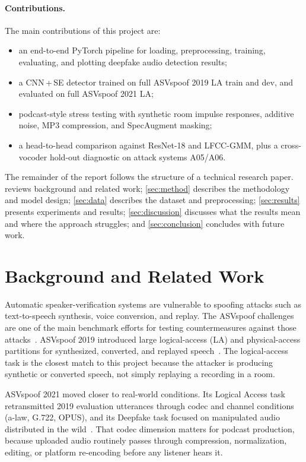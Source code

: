 \documentclass[11pt, letterpaper]{article}
\begin{document}
\paragraph{Contributions.}
The main contributions of this project are:
\begin{itemize}
    \item an end-to-end PyTorch pipeline for loading, preprocessing, training, evaluating, and plotting deepfake audio detection results;
    \item a CNN\,+\,SE detector trained on full ASVspoof 2019 LA train and dev, and evaluated on full ASVspoof 2021 LA;
    \item podcast-style stress testing with synthetic room impulse responses, additive noise, MP3 compression, and SpecAugment masking;
    \item a head-to-head comparison against ResNet-18 and LFCC-GMM, plus a cross-vocoder hold-out diagnostic on attack systems A05/A06.
\end{itemize}

The remainder of the report follows the structure of a technical research paper.  reviews background and related work; \cref{sec:method} describes the methodology and model design; \cref{sec:data} describes the dataset and preprocessing; \cref{sec:results} presents experiments and results; \cref{sec:discussion} discusses what the results mean and where the approach struggles; and \cref{sec:conclusion} concludes with future work.

\section{Background and Related Work}\label{sec:background}

Automatic speaker-verification systems are vulnerable to spoofing attacks such as text-to-speech synthesis, voice conversion, and replay. The ASVspoof challenges are one of the main benchmark efforts for testing countermeasures against those attacks~\cite{nautsch2021asvspoof}. ASVspoof 2019 introduced large logical-access (LA) and physical-access partitions for synthesized, converted, and replayed speech~\cite{wang2020asvspoof2019}. The logical-access task is the closest match to this project because the attacker is producing synthetic or converted speech, not simply replaying a recording in a room.

ASVspoof 2021 moved closer to real-world conditions. Its Logical Access task retransmitted 2019 evaluation utterances through codec and channel conditions (a-law, G.722, OPUS), and its Deepfake task focused on manipulated audio distributed in the wild~\cite{liu2023asvspoof2021}. That codec dimension matters for podcast production, because uploaded audio routinely passes through compression, normalization, editing, or platform re-encoding before any listener hears it.
\end{document}
